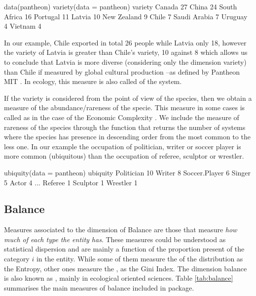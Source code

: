 \begin{example}
data(pantheon)
variety(data = pantheon)
             variety
Canada            27
China             24
South Africa      16
Portugal          11
Latvia            10
New Zealand        9
Chile              7
Saudi Arabia       7
Uruguay            4
Vietnam            4

\end{example}

In our example, Chile exported in total 26 people while Latvia only 18, however the variety of Latvia is greater than Chile's variety, 10 against 8 which allows us to conclude that Latvia is more diverse (considering only the dimension variety) than Chile if measured by global cultural production --as defined by Pantheon MIT \cite{macroconnections_mit_medialab_pantheon_2014}. In ecology, this measure is also called  of the system.

If the variety is considered from the point of view of the species, then we obtain a measure of the abundance/rareness of the specie. This measure in some cases is called  as in the case of the Economic Complexity \cite[p. 21]{hausmann_atlas_2011}. 
We include the measure of rareness of the species through the function  that returns the number of systems where the species has presence in descending order from the most common to the less one.
In our example the occupation of politician, writer or soccer player is more common (ubiquitous) than the occupation of referee, sculptor or wrestler. 

\begin{example}
   ubiquity(data = pantheon)
                    ubiquity
Politician                10
Writer                     8
Soccer.Player              6
Singer                     5
Actor                      4
...
Referee                    1
Sculptor                   1
Wrestler                   1
\end{example}

\subsection{Balance}
Measures associated to the dimension of Balance are those that measure \emph{how much of each type the entity has}. These measures could be understood as statistical dispersion and are mainly a function of the proportion present of the category $i$ in the entity. While some of them measure the  of the distribution as the Entropy, other ones measure the , as the Gini Index. The dimension balance is also known as , mainly in ecological oriented sciences. Table \ref{tab:balance} summarises the main measures of balance included in  package.


